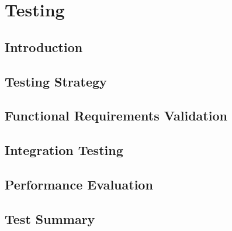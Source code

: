 \chapter{Testing}

\section{Introduction}

\section{Testing Strategy}

\section{Functional Requirements Validation}

\section{Integration Testing}

\section{Performance Evaluation}

\section{Test Summary}
